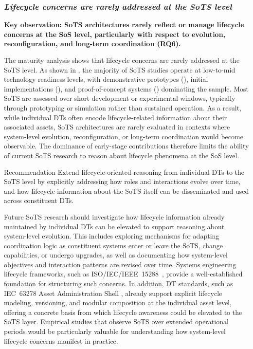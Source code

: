 \subsubsection{\textit{Lifecycle concerns are rarely addressed at the SoTS level}}

\textbf{Key observation: SoTS architectures rarely reflect or manage lifecycle concerns at the SoS level, particularly with respect to evolution, reconfiguration, and long-term coordination (RQ6).}

The maturity analysis shows that lifecycle concerns are rarely addressed at the SoTS level. As shown in , the majority of SoTS studies operate at low-to-mid technology readiness levels, with demonstrative prototypes (), initial implementations (), and proof-of-concept systems () dominating the sample. Most SoTS are assessed over short development or experimental windows, typically through prototyping or simulation rather than sustained operation. As a result, while individual DTs often encode lifecycle-related information about their associated assets, SoTS architectures are rarely evaluated in contexts where system-level evolution, reconfiguration, or long-term coordination would become observable. The dominance of early-stage contributions therefore limits the ability of current SoTS research to reason about lifecycle phenomena at the SoS level.

\begin{recoframe}{Recommendation}
Extend lifecycle-oriented reasoning from individual DTs to the SoTS level by explicitly addressing how roles and interactions evolve over time, and how lifecycle information about the SoTS itself can be disseminated and used across constituent DTs.
\end{recoframe}

Future SoTS research should investigate how lifecycle information already maintained by individual DTs can be elevated to support reasoning about system-level evolution. This includes exploring mechanisms for adapting coordination logic as constituent systems enter or leave the SoTS, change capabilities, or undergo upgrades, as well as documenting how system-level objectives and interaction patterns are revised over time. Systems engineering lifecycle frameworks, such as ISO/IEC/IEEE~15288~\cite{7106435}, provide a well-established foundation for structuring such concerns. In addition, DT standards, such as IEC~63278 Asset Administration Shell \cite{aas_details_2018_p1}, already support explicit lifecycle modeling, versioning, and modular composition at the individual asset level, offering a concrete basis from which lifecycle awareness could be elevated to the SoTS layer. Empirical studies that observe SoTS over extended operational periods would be particularly valuable for understanding how system-level lifecycle concerns manifest in practice.





